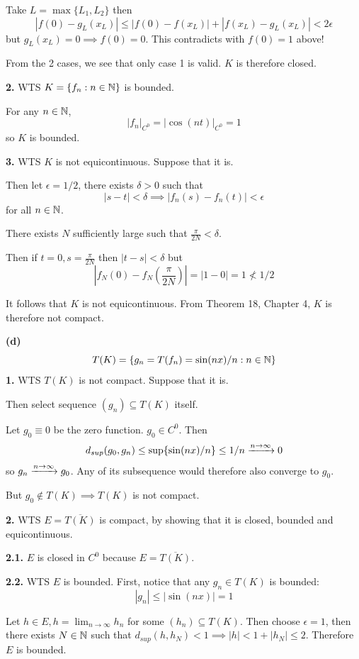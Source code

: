 \documentclass[a4paper, 12pt]{article}
\begin{document}
\begin{solution}
    Take $L = \max\{L_1, L_2\}$ then \[
        |f(0) - g_L(x_L)| \leq |f(0) -f(x_L)| + |f(x_L) - g_L(x_L)| < 2\epsilon
    \]
    but $g_L(x_L) = 0 \implies f(0) = 0$. This contradicts with $f(0) = 1$ above! \contra

    From the 2 cases, we see that only case 1 is valid. $K$ is therefore closed.

    \textbf{2.} WTS $K = \{f_n : n \in \mathbb{N}\}$ is bounded.

    For any $n \in \mathbb{N}$, \[
        |f_n|_{C^0} = |\cos(nt)|_{C^0} = 1
    \]
    so $K$ is bounded.

    \textbf{3.} WTS $K$ is not equicontinuous. Suppose that it is.
    
    Then let $\epsilon = 1/2$, there exists $\delta > 0$ such that \[
    |s - t| < \delta \implies |f_n(s) - f_n(t)| < \epsilon
    \]
    for all $n \in \mathbb{N}$.

    There exists $N$ sufficiently large such that $\frac{\pi}{2N} < \delta$.
    
    Then if $t = 0, s = \frac{\pi}{2N}$ then $|t - s| < \delta$ but \[
    |f_N(0) - f_N\left(\frac{\pi}{2N}\right)| = |1 - 0| = 1 \not < 1/2
    \]

    It follows that $K$ is not equicontinuous. From Theorem 18, Chapter 4, $K$ is therefore not compact.

    \textbf{(d)}
    \[
    T(K) = \{g_n = T(f_n) = \sin(nx)/n : n \in \mathbb{N}\}
    \]
    \textbf{1.} WTS $T(K)$ is not compact. Suppose that it is.
    
    Then select sequence $(g_n) \subseteq T(K)$ itself.

    Let $g_0 \equiv 0$ be the zero function. $g_0 \in C^0$. Then \[
    d_{sup}(g_0, g_n) \leq \sup \{\sin(n x)/n\} \leq 1/n \xrightarrow{n \to \infty} 0
    \]
    so $g_n \xrightarrow{n \to \infty} g_0$. Any of its subsequence would therefore also converge to $g_0$.
    
    But $g_0 \not \in T(K) \implies T(K)$ is not compact.

    \textbf{2.} WTS $E = \overline{T(K)}$ is compact, by showing that it is closed, bounded and equicontinuous.

    \textbf{2.1.} $E$ is closed in $C^0$ because $E = \overline{T(K)}$.

    \textbf{2.2.} WTS $E$ is bounded. First, notice that any $g_n \in T(K)$ is bounded:
    \[
    |g_n| \leq |\sin(nx)| = 1
    \]

    Let $h \in E, h = \lim_{n \to \infty}h_n$ for some $(h_n) \subseteq T(K)$. Then choose $\epsilon = 1$, then there exists $N \in \mathbb{N}$ such that $d_{sup}(h, h_N) < 1 \implies |h| < 1 + |h_N| \leq 2$. Therefore $E$ is bounded.


\end{solution}
\end{document}
